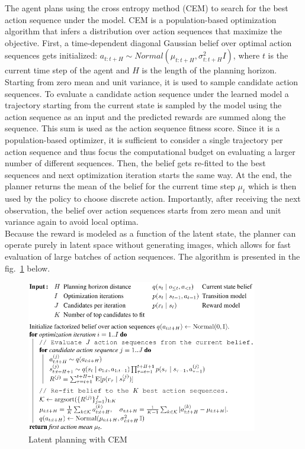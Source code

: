 The agent plans using the cross entropy method (CEM) \cite{Algo.CEM} to search for the best action sequence under the model. CEM is a population-based optimization algorithm that infers a distribution over action sequences that maximize the objective.
First, a time-dependent diagonal Gaussian belief over optimal action sequences gets initialized: $a_{t:t+H} \sim Normal(\mu_{t:t+H}, \sigma^2_{t:t+H}I)$, where $t$ is the current time step of the agent and $H$ is the length of the planning horizon. Starting from zero mean and unit variance, it is used to sample candidate action sequences. To evaluate a candidate action sequence under the learned model a trajectory starting from the current state is sampled by the model using the action sequence as an input and the predicted rewards are summed along the sequence. This sum is used as the action sequence fitness score. Since it is a population-based optimizer, it is sufficient to consider a single trajectory per action sequence and thus focus the computational budget on evaluating a larger number of different sequences. Then, the belief gets re-fitted to the best sequences and next optimization iteration starts the same way. At the end, the planner returns the mean of the belief for the current time step $\mu_t$ which is then used by the policy to choose discrete action. Importantly, after receiving the next observation, the belief over action sequences starts from zero mean and unit variance again to avoid local optima. \\
Because the reward is modeled as a function of the latent state, the planner can operate purely in latent space without generating images, which allows for fast evaluation of large batches of action sequences. The algorithm is presented in the fig.~\ref{Fig.CEMinPlaNet} below.

\begin{figure}[H]
\includegraphics[width=0.9\textwidth,keepaspectratio]{figures/PlaNet/CEM.png}
\caption{Latent planning with CEM \cite{Algo.PlaNet}}
\label{Fig.CEMinPlaNet}
\end{figure}

